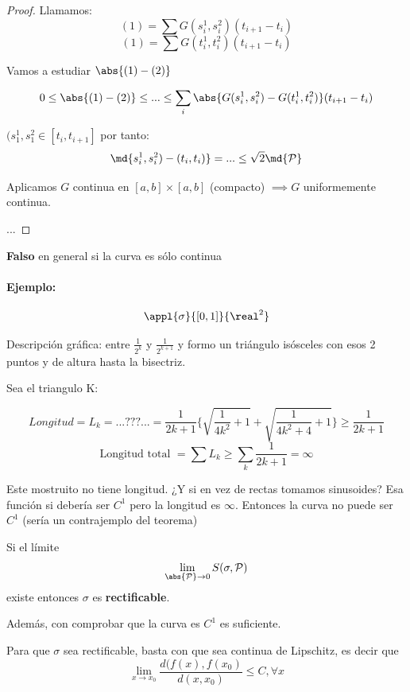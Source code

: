 \begin{proof}
Llamamos:
\[(1) = \sum G(s_i^1,s_i^2)(t_{i+1}-t_i)\]
\[(1) = \sum G(t_i^1,t_i^2)(t_{i+1}-t_i)\]

Vamos a estudiar $\abs{(1)-(2)}$

\[0\leq \abs{(1)-(2)} \leq ... \leq \sum_i \abs{G(s_i^1,s_i^2)- G(t_i^1,t_i^2)}(t_{i+1}-t_i)\]

$(s_1^1, s_1^2 \in [t_i,t_{i+1}]$ por tanto:
\[\md{s_i^1,s_i^2) - (t_i,t_i)} = ... \leq \sqrt{2}\md{\mathcal{P}}\]

Aplicamos $G$ continua en $[a,b]\times [a,b]$ (compacto) $\implies G$ uniformemente continua.

...

\end{proof}

\obs \textbf{Falso} en general si la curva es sólo continua

\paragraph{Ejemplo:}

\[\appl{\sigma}{[0,1]}{\real^2}\]


Descripción gráfica: entre $\frac{1}{2^k}$ y $\frac{1}{2^{k+1}}$ y formo un triángulo isósceles con esos 2 puntos y de altura hasta la bisectriz.

Sea el triangulo K:


\[Longitud =L_k = ... ??? ... = \frac{1}{2k+1} \{\sqrt{\frac{1}{4k^2}+1} + \sqrt{\frac{1}{4k^2+4} +1} \} \ge \frac{1}{2k+1}\]
\[\text{Longitud total } = \sum L_k \ge \sum_k \frac{1}{2k+1} = \infty\]

Este mostruito no tiene longitud. ¿Y si en vez de rectas tomamos sinusoides? Esa función si debería ser $C^1$ pero la longitud es $\infty$. Entonces la curva no puede ser $C^1$ (sería un contrajemplo del teorema)

\begin{defn}
Si el límite \[ \lim_{\abs{\mathcal{P}}\rightarrow 0} S(\sigma,\mathcal{P})\] existe entonces $\sigma$ es \textbf{rectificable}. 

Además, con comprobar que la curva es $C^1$ es suficiente.

Para que $\sigma$ sea rectificable, basta con que sea continua de Lipschitz, es decir que \[\lim_{x\to x_0} \frac{d(f(x),f(x_0)}{d(x,x_0)}\leq C,\forall x\]

\end{defn}


